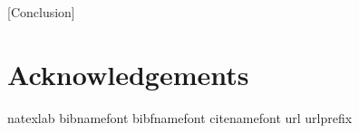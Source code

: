 \documentclass[twocolumn,secnumarabic,amssymb, nobibnotes, aps, prl,
superscriptaddress, nobalancelastpage]{revtex4}
\begin{document}
[Conclusion]

\section{Acknowledgements}


\begin{thebibliography}{32} \expandafter\ifx\csname
        natexlab\endcsname\relax\def\natexlab#1{#1}\fi \expandafter\ifx\csname
        bibnamefont\endcsname\relax \def\bibnamefont#1{#1}\fi
        \expandafter\ifx\csname bibfnamefont\endcsname\relax
        \def\bibfnamefont#1{#1}\fi \expandafter\ifx\csname
        citenamefont\endcsname\relax \def\citenamefont#1{#1}\fi
        \expandafter\ifx\csname url\endcsname\relax \def\url#1{\texttt{#1}}\fi
        \expandafter\ifx\csname urlprefix\endcsname\relax\def\urlprefix{URL
        }\fi \providecommand{\bibinfo}[2]{#2}
        \providecommand{\eprint}[2][]{\url{#2}}

\end{thebibliography}
\end{document}
